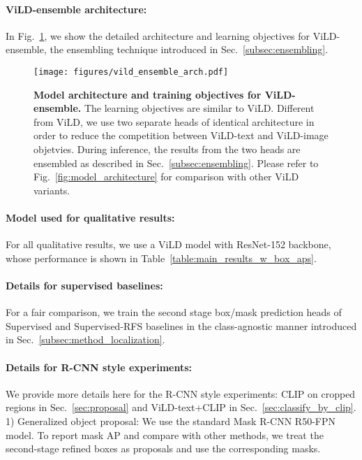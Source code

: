 \documentclass{article} \usepackage{iclr2022_conference,times}
\begin{document}
\paragraph{ViLD-ensemble architecture:} In Fig.~\ref{fig:vild_ensemble}, we show the detailed architecture and learning objectives for ViLD-ensemble, the ensembling technique introduced in Sec.~\ref{subsec:ensembling}.

\begin{figure}[t]
\centering
    \texttt{[image: figures/vild\_ensemble\_arch.pdf]}
    \caption{\textbf{Model architecture and training objectives for ViLD-ensemble.} The learning objectives are similar to ViLD. Different from ViLD, we use two separate heads of identical architecture in order to reduce the competition between ViLD-text and ViLD-image objetvies. During inference, the results from the two heads are ensembled as described in Sec.~\ref{subsec:ensembling}. Please refer to Fig.~\ref{fig:model_architecture} for comparison with other ViLD variants.}
    \label{fig:vild_ensemble}
\end{figure}


\paragraph{Model used for qualitative results:}
For all qualitative results, we use a ViLD model with ResNet-152 backbone, whose performance is shown in Table~\ref{table:main_results_w_box_aps}.

\paragraph{Details for supervised baselines:}
For a fair comparison, we train the second stage box/mask prediction heads of Supervised and Supervised-RFS baselines in the class-agnostic manner introduced in Sec.~\ref{subsec:method_localization}.

\paragraph{Details for R-CNN style experiments:}
We provide more details here for the R-CNN style experiments: CLIP on cropped regions in Sec.~\ref{sec:proposal} and ViLD-text+CLIP in Sec.~\ref{sec:classify_by_clip}.
1) Generalized object proposal:
We use the standard Mask R-CNN R50-FPN model.
To report mask AP and compare with other methods, we treat the second-stage refined boxes as proposals and use the corresponding masks.
\end{document}
